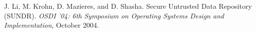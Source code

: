 
\begin{thebibliography}{}

J. Li, M. Krohn, D. Mazieres, and D. Shasha.
Secure Untrusted Data Repository (SUNDR).
\emph{OSDI ’04: 6th Symposium on Operating Systems Design and Implementation},
October 2004.



\end{thebibliography}
